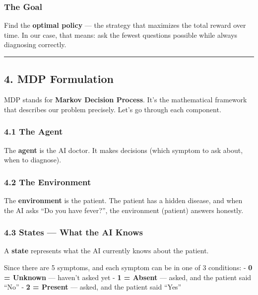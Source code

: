 \documentclass[
]{article}
\begin{document}
\hypertarget{the-goal}{%
\subsubsection{The Goal}\label{the-goal}}

Find the \textbf{optimal policy} --- the strategy that maximizes the
total reward over time. In our case, that means: ask the fewest
questions possible while always diagnosing correctly.

\begin{center}\rule{0.5\linewidth}{0.5pt}\end{center}

\hypertarget{mdp-formulation}{%
\subsection{4. MDP Formulation}\label{mdp-formulation}}

MDP stands for \textbf{Markov Decision Process}. It's the mathematical
framework that describes our problem precisely. Let's go through each
component.

\hypertarget{the-agent}{%
\subsubsection{4.1 The Agent}\label{the-agent}}

The \textbf{agent} is the AI doctor. It makes decisions (which symptom
to ask about, when to diagnose).

\hypertarget{the-environment}{%
\subsubsection{4.2 The Environment}\label{the-environment}}

The \textbf{environment} is the patient. The patient has a hidden
disease, and when the AI asks ``Do you have fever?'', the environment
(patient) answers honestly.

\hypertarget{states-what-the-ai-knows}{%
\subsubsection{4.3 States --- What the AI
Knows}\label{states-what-the-ai-knows}}

A \textbf{state} represents what the AI currently knows about the
patient.

Since there are 5 symptoms, and each symptom can be in one of 3
conditions: - \textbf{0 = Unknown} --- haven't asked yet - \textbf{1 =
Absent} --- asked, and the patient said ``No'' - \textbf{2 = Present}
--- asked, and the patient said ``Yes''
\end{document}
